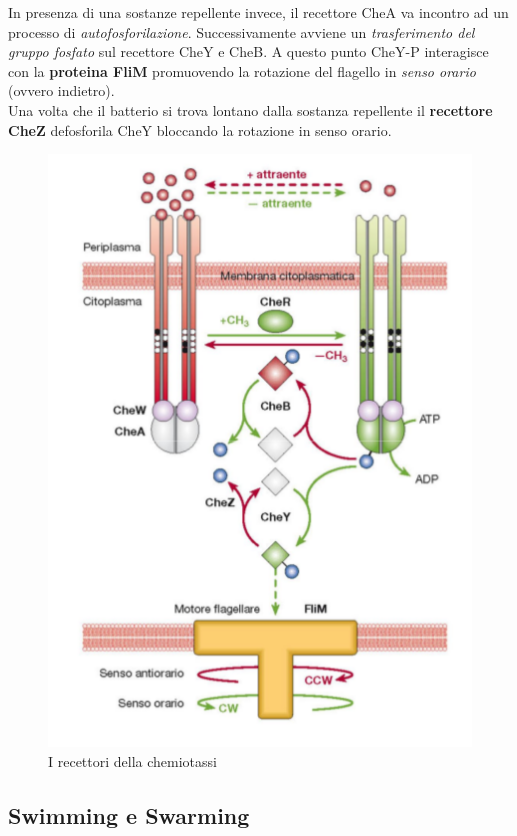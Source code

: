 \documentclass[11pt]{book}
\begin{document}
\vspace{1em}
In presenza di una sostanze repellente invece, il recettore CheA va incontro ad un processo di \emph{autofosforilazione}. Successivamente avviene un \emph{trasferimento del gruppo fosfato} sul recettore CheY e CheB. A questo punto CheY-P interagisce con la \textbf{proteina FliM} promuovendo la rotazione del flagello in \emph{senso orario} (ovvero indietro).\\
Una volta che il batterio si trova lontano dalla sostanza repellente il \textbf{recettore CheZ} defosforila CheY bloccando la rotazione in senso orario.

\begin{figure}[htp]
\centering
\includegraphics[scale=0.5]{img/Recettori chemiotassi.png}
\caption{I recettori della chemiotassi}
\label{}
\end{figure}

\clearpage

\subsection{Swimming e Swarming}
\end{document}
